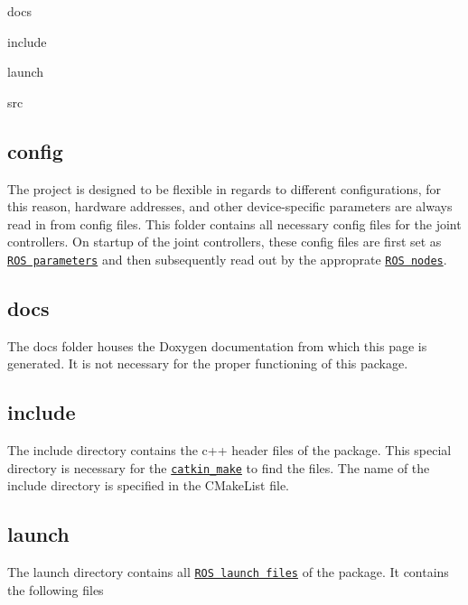 docs
\begin{DoxyItemize}
\item include
\item launch
\item src 
\end{DoxyItemize}\hypertarget{index_config_dir}{}\subsection{config}\label{index_config_dir}
The project is designed to be flexible in regards to different configurations, for this reason, hardware addresses, and other device-\/specific parameters are always read in from config files. This folder contains all necessary config files for the joint controllers. On startup of the joint controllers, these config files are first set as \href{http://wiki.ros.org/Parameter%20Server}{\tt R\+OS parameters} and then subsequently read out by the approprate \href{http://wiki.ros.org/Nodes}{\tt R\+OS nodes}. \hypertarget{index_docs_dir}{}\subsection{docs}\label{index_docs_dir}
The docs folder houses the Doxygen documentation from which this page is generated. It is not necessary for the proper functioning of this package. \hypertarget{index_include_dir}{}\subsection{include}\label{index_include_dir}
The include directory contains the c++ header files of the package. This special directory is necessary for the \href{http://wiki.ros.org/catkin/commands/catkin_make}{\tt catkin\+\_\+make} to find the files. The name of the include directory is specified in the C\+Make\+List file. \hypertarget{index_launch_dir}{}\subsection{launch}\label{index_launch_dir}
The launch directory contains all \href{http://wiki.ros.org/roslaunch}{\tt R\+OS launch files} of the package. It contains the following files

